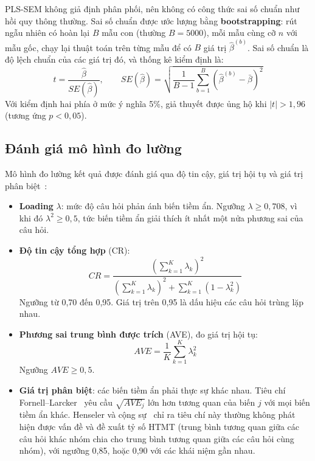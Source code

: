 PLS-SEM không giả định phân phối, nên không có công thức sai số chuẩn như hồi quy thông thường. Sai số chuẩn được ước lượng bằng \textbf{bootstrapping}: rút ngẫu nhiên có hoàn lại $B$ mẫu con (thường $B = 5000$), mỗi mẫu cùng cỡ $n$ với mẫu gốc, chạy lại thuật toán trên từng mẫu để có $B$ giá trị $\hat\beta^{(b)}$. Sai số chuẩn là độ lệch chuẩn của các giá trị đó, và thống kê kiểm định là:
\begin{equation}
t = \frac{\hat\beta}{SE(\hat\beta)}, \qquad SE(\hat\beta) = \sqrt{\frac{1}{B-1}\sum_{b=1}^{B}\left(\hat\beta^{(b)} - \bar{\beta}\right)^2}
\label{eq:bootstrap}
\end{equation}
Với kiểm định hai phía ở mức ý nghĩa 5\%, giả thuyết được ủng hộ khi $|t| > 1{,}96$ (tương ứng $p < 0{,}05$).

\subsection{Đánh giá mô hình đo lường}

Mô hình đo lường kết quả được đánh giá qua độ tin cậy, giá trị hội tụ và giá trị phân biệt~\cite{hair2019report,hair2022primer}:
\begin{itemize}
  \item \textbf{Loading} $\lambda$: mức độ câu hỏi phản ánh biến tiềm ẩn. Ngưỡng $\lambda \geq 0{,}708$, vì khi đó $\lambda^2 \geq 0{,}5$, tức biến tiềm ẩn giải thích ít nhất một nửa phương sai của câu hỏi.
  \item \textbf{Độ tin cậy tổng hợp} (CR):
  \begin{equation}
  CR = \frac{\left(\sum_{k=1}^{K}\lambda_k\right)^2}{\left(\sum_{k=1}^{K}\lambda_k\right)^2 + \sum_{k=1}^{K}\left(1 - \lambda_k^2\right)}
  \label{eq:cr}
  \end{equation}
  Ngưỡng từ 0,70 đến 0,95. Giá trị trên 0,95 là dấu hiệu các câu hỏi trùng lặp nhau.
  \item \textbf{Phương sai trung bình được trích} (AVE), đo giá trị hội tụ:
  \begin{equation}
  AVE = \frac{1}{K}\sum_{k=1}^{K}\lambda_k^2
  \label{eq:ave}
  \end{equation}
  Ngưỡng $AVE \geq 0{,}5$.
  \item \textbf{Giá trị phân biệt}: các biến tiềm ẩn phải thực sự khác nhau. Tiêu chí Fornell--Larcker~\cite{fornell1981} yêu cầu $\sqrt{AVE_j}$ lớn hơn tương quan của biến $j$ với mọi biến tiềm ẩn khác. Henseler và cộng sự~\cite{henseler2015} chỉ ra tiêu chí này thường không phát hiện được vấn đề và đề xuất tỷ số HTMT (trung bình tương quan giữa các câu hỏi khác nhóm chia cho trung bình tương quan giữa các câu hỏi cùng nhóm), với ngưỡng 0,85, hoặc 0,90 với các khái niệm gần nhau.
\end{itemize}

